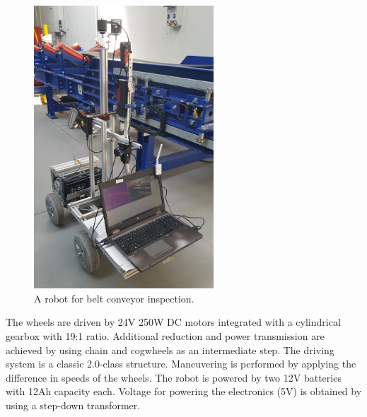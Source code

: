 \documentclass[3p,times,12pt]{elsarticle}
\begin{document}
\begin{figure}[ht!]
\begin{minipage}[c]{0.48\textwidth}
\includegraphics[width=0.6\textwidth,  height=\textwidth]{robot.jpg}
\caption{A robot for belt conveyor inspection.}
\label{fig:robot_fig}
\end{minipage}
\end{figure}

The wheels are driven by 24V 250W DC motors integrated with a cylindrical gearbox with 19:1 ratio. Additional reduction and power transmission are achieved by using chain and cogwheels as an intermediate step. The driving system is a classic 2.0-class structure. Maneuvering is performed by applying the difference in speeds of the wheels. The robot is powered by two 12V batteries with 12Ah capacity each. Voltage for powering the electronics (5V) is obtained by using a step-down transformer.
\end{document}
